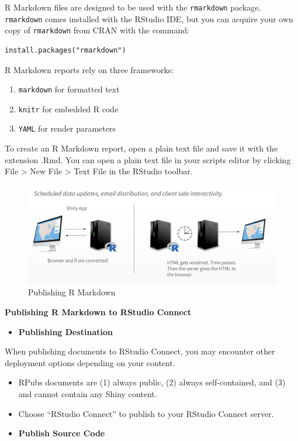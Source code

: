 \documentclass[]{book}
\providecommand{\tightlist}{%
  \setlength{\itemsep}{0pt}\setlength{\parskip}{0pt}}
\theoremstyle{definition}
\theoremstyle{definition}
\theoremstyle{definition}
\theoremstyle{remark}
\begin{document}
R Markdown files are designed to be used with the \texttt{rmarkdown}
package. \texttt{rmarkdown} comes installed with the RStudio IDE, but
you can acquire your own copy of \texttt{rmarkdown} from CRAN with the
command:

\begin{verbatim}
install.packages("rmarkdown")
\end{verbatim}

R Markdown reports rely on three frameworks:

\begin{enumerate}
\def\labelenumi{\arabic{enumi}.}
\tightlist
\item
  \texttt{markdown} for formatted text
\item
  \texttt{knitr} for embedded R code
\item
  \texttt{YAML} for render parameters
\end{enumerate}

To create an R Markdown report, open a plain text file and save it with
the extension .Rmd. You can open a plain text file in your scripts
editor by clicking File \textgreater{} New File \textgreater{} Text File
in the RStudio toolbar.

\begin{figure}
\centering
\includegraphics{imgs/shiny-alt/rmd-diagram.png}
\caption{Publishing R Markdown}
\end{figure}

\textbf{Publishing R Markdown to RStudio Connect}

\begin{itemize}
\tightlist
\item
  \textbf{Publishing Destination}
\end{itemize}

When publishing documents to RStudio Connect, you may encounter other
deployment options depending on your content.

\begin{itemize}
\item
  RPubs documents are (1) always public, (2) always self-contained, and
  (3) and cannot contain any Shiny content.
\item
  Choose ``RStudio Connect'' to publish to your RStudio Connect server.
\item
  \textbf{Publish Source Code}
\end{itemize}
\end{document}

